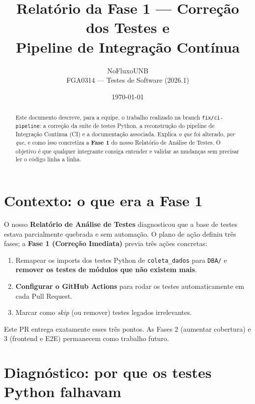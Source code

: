 \documentclass[11pt,a4paper]{article}
\title{\textbf{Relatório da Fase 1 --- Correção dos Testes e\\ Pipeline de Integração Contínua}}
\author{NoFluxoUNB \\ \small FGA0314 --- Testes de Software (2026.1)}
\date{\today}
\begin{document}
\maketitle

\begin{abstract}
\noindent
Este documento descreve, para a equipe, o trabalho realizado na branch
\texttt{fix/ci-pipeline}: a correção da suíte de testes Python, a reconstrução
do pipeline de Integração Contínua (CI) e a documentação associada. Explica
\emph{o que} foi alterado, \emph{por que}, e como isso concretiza a
\textbf{Fase 1} do nosso Relatório de Análise de Testes. O objetivo é que
qualquer integrante consiga entender e validar as mudanças sem precisar ler o
código linha a linha.
\end{abstract}

\tableofcontents
\bigskip

\section{Contexto: o que era a Fase 1}

O nosso \textbf{Relatório de Análise de Testes} diagnosticou que a base de
testes estava parcialmente quebrada e sem automação. O plano de ação definiu
três fases; a \textbf{Fase 1 (Correção Imediata)} previa três ações concretas:

\begin{enumerate}[label=\textbf{(\arabic*)}]
  \item Remapear os imports dos testes Python de \texttt{coleta\_dados} para
        \texttt{DBA/} e \textbf{remover os testes de módulos que não existem mais}.
  \item \textbf{Configurar o GitHub Actions} para rodar os testes automaticamente
        em cada Pull Request.
  \item Marcar como \emph{skip} (ou remover) testes legados irrelevantes.
\end{enumerate}

Este PR entrega exatamente esses três pontos. As Fases 2 (aumentar cobertura)
e 3 (frontend e E2E) permanecem como trabalho futuro.

\section{Diagnóstico: por que os testes Python falhavam}
\end{document}
